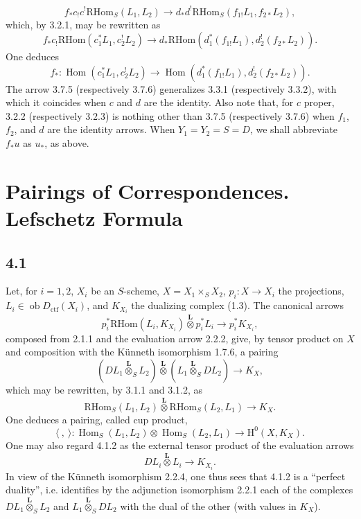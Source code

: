 \documentclass[11pt]{article}
\renewcommand{\H}{\mathrm{H}}
\DeclareMathOperator{\Hom}{Hom}
\newcommand{\ob}{\operatorname{ob}}
\providecommand{\RHom}{\mathrm{RHom}}
\providecommand{\Dctf}{D_{\mathrm{ctf}}}
\providecommand{\Dctf}{D_{\mathrm{ctf}}}
\providecommand{\RHom}{\mathrm{RHom}}
\providecommand{\Hom}{\operatorname{Hom}}
\providecommand{\ob}{\operatorname{ob}}
\providecommand{\RHom}{\mathrm R\mathcal{H}om}
\providecommand{\RHom}{\mathrm{RHom}}
\begin{document}
\begin{equation}
f_*c_!c^!\RHom_S(L_1,L_2)
\longrightarrow
 d_*d^!\RHom_S(f_{1!}L_1,f_{2*}L_2),
\tag{3.7.4}
\end{equation}
which, by 3.2.1, may be rewritten as
\begin{equation}
f_*c_!\RHom(c_1^*L_1,c_2^!L_2)
\longrightarrow
 d_*\RHom(d_1^*(f_{1!}L_1),d_2^!(f_{2*}L_2)).
\tag{3.7.5}
\end{equation}
One deduces
\begin{equation}
f_*:\Hom(c_1^*L_1,c_2^!L_2)
\longrightarrow
\Hom(d_1^*(f_{1!}L_1),d_2^!(f_{2*}L_2)).
\tag{3.7.6}
\end{equation}
The arrow 3.7.5 (respectively 3.7.6) generalizes 3.3.1 (respectively 3.3.2), with which it coincides when $c$ and $d$ are the identity. Also note that, for $c$ proper, 3.2.2 (respectively 3.2.3) is nothing other than 3.7.5 (respectively 3.7.6) when $f_1$, $f_2$, and $d$ are the identity arrows. When $Y_1=Y_2=S=D$, we shall abbreviate $f_*u$ as $u_*$, as above.

\section{Pairings of Correspondences. Lefschetz Formula}

\subsection*{4.1}
Let, for $i=1,2$, $X_i$ be an $S$-scheme, $X=X_1\times_SX_2$, $p_i:X\to X_i$ the projections, $L_i\in\ob\Dctf(X_i)$, and $K_{X_i}$ the dualizing complex (1.3). The canonical arrows
\begin{equation}
p_i^*\RHom(L_i,K_{X_i})\overset{\mathbf L}{\otimes}p_i^*L_i
\longrightarrow p_i^*K_{X_i},
\tag{4.1.1}
\end{equation}
composed from 2.1.1 and the evaluation arrow 2.2.2, give, by tensor product on $X$ and composition with the Künneth isomorphism 1.7.6, a pairing
\begin{equation}
(DL_1\overset{\mathbf L}{\otimes}_S L_2)\overset{\mathbf L}{\otimes}(L_1\overset{\mathbf L}{\otimes}_S DL_2)
\longrightarrow K_X,
\tag{4.1.2}
\end{equation}
which may be rewritten, by 3.1.1 and 3.1.2, as
\begin{equation}
\RHom_S(L_1,L_2)\overset{\mathbf L}{\otimes}\RHom_S(L_2,L_1)
\longrightarrow K_X.
\tag{4.1.3}
\end{equation}
One deduces a pairing, called cup product,
\begin{equation}
\langle\ ,\ \rangle:\Hom_S(L_1,L_2)\otimes\Hom_S(L_2,L_1)
\longrightarrow \H^0(X,K_X).
\tag{4.1.4}
\end{equation}
One may also regard 4.1.2 as the external tensor product of the evaluation arrows
\[
DL_i\overset{\mathbf L}{\otimes}L_i\longrightarrow K_{X_i}.
\]
In view of the Künneth isomorphism 2.2.4, one thus sees that 4.1.2 is a ``perfect duality'', i.e. identifies by the adjunction isomorphism 2.2.1 each of the complexes $DL_1\overset{\mathbf L}{\otimes}_S L_2$ and $L_1\overset{\mathbf L}{\otimes}_S DL_2$ with the dual of the other (with values in $K_X$).
\end{document}
